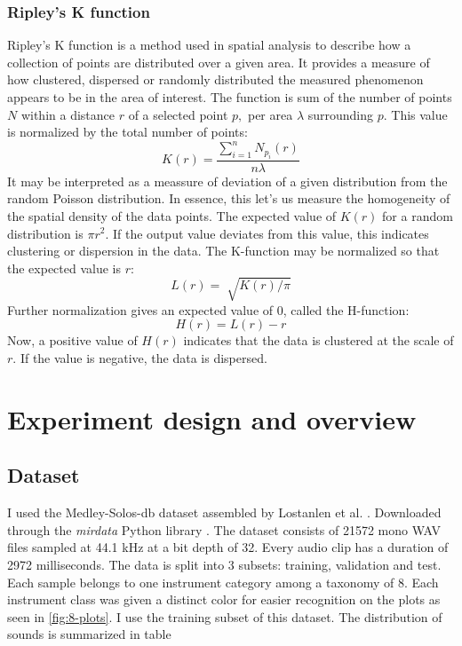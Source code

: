 \documentclass[a4paper, 12pt, twoside]{report}
\begin{document}
\subsection{Ripley's K function}
\label{sec:org533d625}

Ripley's K function is a method used in spatial analysis to describe how a collection of points are distributed over a given area. It provides a measure of how clustered, dispersed or randomly distributed the measured phenomenon appears to be in the area of interest. The function is sum of the number of points $N$ within a distance $r$ of a selected point $p,$ per area \(\lambda\) surrounding $p.$ This value is normalized by the total number of points:
\[K(r) = \frac{\sum_{i=1}^{n}N_{p_{i}}(r)}{n \lambda}\]
It may be interpreted as a meassure of deviation of a given distribution from the random Poisson distribution. In essence, this let's us measure the homogeneity of the spatial density of the data points. The expected value of \(K(r)\) for a random distribution is \(\pi r^{2}\). If the output value deviates from this value, this indicates clustering or dispersion in the data. The K-function may be normalized so that the expected value is $r$:
\[L(r) = \sqrt[]{K(r)/\pi}\]
Further normalization gives an expected value of 0, called the H-function:
\[H(r) = L(r) - r\]
Now, a positive value of \(H(r)\) indicates that the data is clustered at the scale of $r$. If the value is negative, the data is dispersed.

\newpage

\chapter{Experiment design and overview}
\label{sec:orga220b5b}
\section{Dataset}
\label{sec:orgac308b8}

I used the Medley-Solos-db dataset assembled by Lostanlen et al. \cite{medley}. Downloaded through the \textit{ mirdata } Python library \cite{bittner_fuentes_2019}. The dataset consists of 21572 mono WAV files sampled at 44.1 kHz at a bit depth of 32. Every audio clip has a duration of 2972 milliseconds. The data is split into 3 subsets: training, validation and test. Each sample belongs to one instrument category among a taxonomy of 8. Each instrument class was given a distinct color for easier recognition on the plots as seen in \ref{fig:8-plots}. I use the training subset of this dataset. The distribution of sounds is summarized in table \
\end{document}
